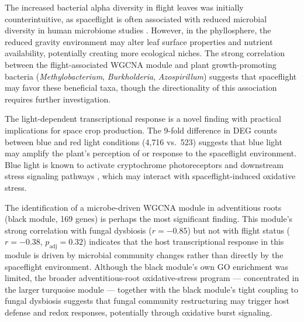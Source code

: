 \documentclass[pdflatex,sn-nature]{sn-jnl}
\begin{document}
The increased bacterial alpha diversity in flight leaves was initially
counterintuitive, as spaceflight is often associated with reduced microbial
diversity in human microbiome studies \cite{voorhies2019b}. However, in the
phyllosphere, the reduced gravity environment may alter leaf surface properties and
nutrient availability, potentially creating more ecological niches. The strong
correlation between the flight-associated WGCNA module and plant growth-promoting
bacteria (\textit{Methylobacterium}, \textit{Burkholderia}, \textit{Azospirillum})
suggests that spaceflight may favor these beneficial taxa, though the directionality
of this association requires further investigation.

The light-dependent transcriptional response is a novel finding with practical
implications for space crop production. The 9-fold difference in DEG counts between
blue and red light conditions (4{,}716 vs.\ 523) suggests that blue light may
amplify the plant's perception of or response to the spaceflight environment. Blue
light is known to activate cryptochrome photoreceptors and downstream stress
signaling pathways \cite{chaves2011}, which may interact with spaceflight-induced
oxidative stress.

The identification of a microbe-driven WGCNA module in adventitious roots (black
module, 169 genes) is perhaps the most significant finding. This module's strong
correlation with fungal dysbiosis (\(r = -0.85\)) but not with flight status (\(r =
-0.38\), \(p_{\mathrm{adj}} = 0.32\)) indicates that the host transcriptional response in this
module is driven by microbial community changes rather than directly by the
spaceflight environment. Although the black module's own GO enrichment was limited,
the broader adventitious-root oxidative-stress program --- concentrated in the
larger turquoise module --- together with the black module's tight coupling to
fungal dysbiosis suggests that fungal community restructuring may trigger host
defense and redox responses, potentially through oxidative burst signaling.
\end{document}
